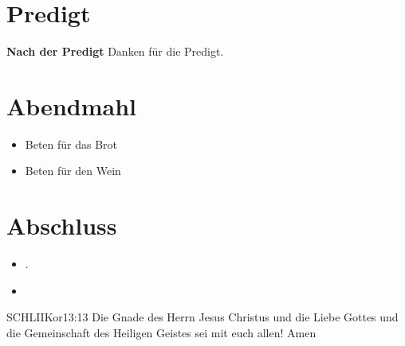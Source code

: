 \documentclass[fontsize=14pt]{../../inc/mybib}
\begin{document}
\section{Predigt}
\textbf{Nach der Predigt}\newline
Danken für die Predigt.
\section{Abendmahl}
\begin{itemize}
    \item [] Beten für das Brot
    \item [] Beten für den Wein
\end{itemize}
\section{Abschluss}
\begin{itemize}
    \item [] .
    \item [] 
\end{itemize}
\begin{bibelbox}{SCHL}{IIKor}{13:13}
    Die Gnade des Herrn Jesus Christus und die Liebe Gottes und die Gemeinschaft des Heiligen Geistes sei mit euch allen! Amen
\end{bibelbox}
\end{document}
